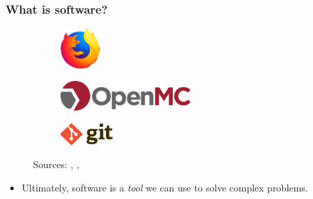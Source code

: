\begin{frame}
  \frametitle{What is software?}
  \begin{figure}[htpb]
      \centering
      \begin{subfigure}
        \centering
        \includegraphics[width=1.5cm]{images/firefox-logo.png}
      \end{subfigure}
      \begin{subfigure}
        \centering
        \includegraphics[width=5cm]{images/openmc-logo.png}
      \end{subfigure}
      \begin{subfigure}
        \centering
        \includegraphics[width=2cm]{images/git-logo.png}
      \end{subfigure}
      \newline
      {\tiny Sources: \cite{firefox_logo}, \cite{openmc_logo}, \cite{git_logo}}
  \end{figure}
  \pause\medskip
  \begin{itemize}
      \item Ultimately, software is a {\it tool} we can use to solve complex problems.
  \end{itemize}
\end{frame}

